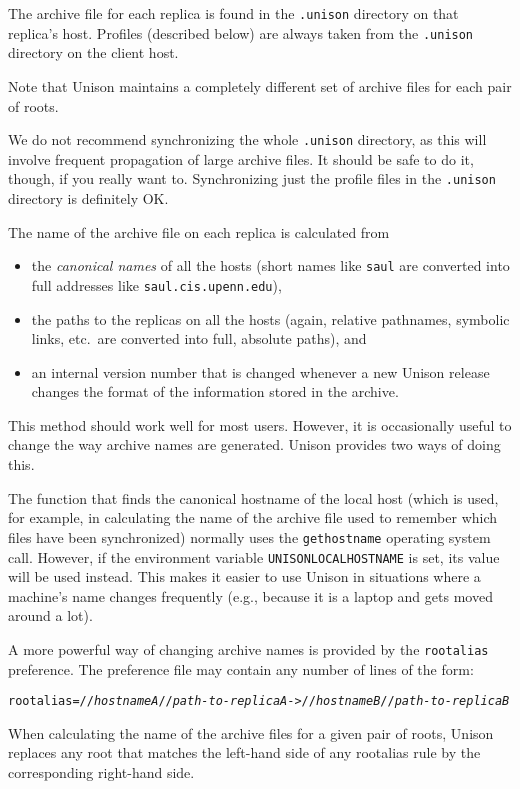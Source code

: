 \documentclass{article}
\newcommand{\NT}[1]{\textit{#1}}
\begin{document}
The archive file for each replica is found in the {\tt .unison}
directory on that replica's host.  Profiles (described below) are
always taken from the {\tt .unison} directory on the client host.

Note that Unison maintains a completely different set of archive files
for each pair of roots.

We do not recommend synchronizing the whole {\tt .unison} directory, as this
will involve frequent propagation of large archive files.  It should be safe
to do it, though, if you really want to.  Synchronizing just the profile
files in the {\tt .unison} directory is definitely OK.



The name of the archive file on each replica is calculated from 
\begin{itemize}
\item the {\em canonical names} of all the hosts (short names like
  \verb|saul| are converted into full addresses like \verb|saul.cis.upenn.edu|), 
\item the paths to the replicas on all the hosts (again, relative
  pathnames, symbolic links, etc.\ are converted into full, absolute paths), and 
\item an internal version number that is changed whenever a new Unison
  release changes the format of the information stored in the archive.
\end{itemize}
This method should work well for most users.  However, it is occasionally
useful to change the way archive names are generated.  Unison provides
two ways of doing this.

The function that finds the canonical hostname of the local host (which
is used, for example, in calculating the name of the archive file used to
remember which files have been synchronized) normally uses the
\verb|gethostname| operating system call.  However, if the environment
variable \verb|UNISONLOCALHOSTNAME| is set, its value will be used
instead.  This makes it easier to use Unison in situations where a
machine's name changes frequently (e.g., because it is a laptop and gets
moved around a lot).

A more powerful way of changing archive names is provided by the
\verb|rootalias| preference.  The preference file may contain any number of
lines of the form: 
\begin{alltt}
    rootalias = //\NT{hostnameA}//\NT{path-to-replicaA} -> //\NT{hostnameB}//\NT{path-to-replicaB}
\end{alltt}
When calculating the name of the archive files for a given pair of roots,
Unison replaces any root that matches the left-hand side of any rootalias
rule by the corresponding right-hand side.
\end{document}
